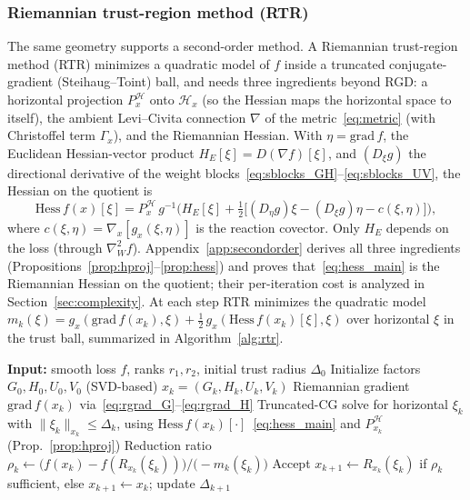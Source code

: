 \documentclass[letterpaper, 10 pt, conference]{ieeeconf}
\newcommand{\cH}{\mathcal{H}}
\theoremstyle{plain}
\theoremstyle{definition}
\theoremstyle{remark}
\begin{document}
\subsubsection{Riemannian trust-region method (RTR)}
\label{sec:rtr}
The same geometry supports a second-order method. A Riemannian trust-region method (RTR) minimizes a quadratic model of $f$ inside a truncated conjugate-gradient (Steihaug--Toint) ball, and needs three ingredients beyond RGD: a horizontal projection $P_x^{\cH}$ onto $\cH_x$ (so the Hessian maps the horizontal space to itself), the ambient Levi--Civita connection $\nabla$ of the metric~\eqref{eq:metric} (with Christoffel term $\Gamma_x$), and the Riemannian Hessian. With $\eta=\mathrm{grad}\,f$, the Euclidean Hessian-vector product $H_E[\xi]=D(\nabla f)[\xi]$, and $(D_\xi g)$ the directional derivative of the weight blocks~\eqref{eq:sblocks_GH}--\eqref{eq:sblocks_UV}, the Hessian on the quotient is
\begin{equation}
  \mathrm{Hess}\,f(x)[\xi] = P_x^{\cH}\,g^{-1}\!\Big(H_E[\xi] + \tfrac12\big[(D_\eta g)\xi - (D_\xi g)\eta - c(\xi,\eta)\big]\Big),
  \label{eq:hess_main}
\end{equation}
where $c(\xi,\eta)=\nabla_x[g_x(\xi,\eta)]$ is the reaction covector. Only $H_E$ depends on the loss (through $\nabla^2_W f$). Appendix~\ref{app:secondorder} derives all three ingredients (Propositions~\ref{prop:hproj}--\ref{prop:hess}) and proves that~\eqref{eq:hess_main} is the Riemannian Hessian on the quotient; their per-iteration cost is analyzed in Section~\ref{sec:complexity}. At each step RTR minimizes the quadratic model $m_k(\xi)=g_x(\mathrm{grad}\,f(x_k),\xi)+\tfrac12\,g_x(\mathrm{Hess}\,f(x_k)[\xi],\xi)$ over horizontal $\xi$ in the trust ball, summarized in Algorithm~\ref{alg:rtr}. 

\begin{algorithm}[t]
\caption{RTR on the Hadamard low-rank manifold}
\label{alg:rtr}
\begin{algorithmic}[1]
\STATE \textbf{Input:} smooth loss $f$, ranks $r_1,r_2$, initial trust radius $\Delta_0$
\STATE Initialize factors $G_0,H_0,U_0,V_0$ (SVD-based)
  \STATE $x_k=(G_k,H_k,U_k,V_k)$
  \STATE Riemannian gradient $\mathrm{grad}\,f(x_k)$ via~\eqref{eq:rgrad_G}--\eqref{eq:rgrad_H}
  \STATE Truncated-CG solve for horizontal $\xi_k$ with $\|\xi_k\|_{x_k}\le\Delta_k$, using $\mathrm{Hess}\,f(x_k)[\cdot]$~\eqref{eq:hess_main} and $P_{x_k}^{\cH}$ (Prop.~\ref{prop:hproj})
  \STATE Reduction ratio $\rho_k \leftarrow \big(f(x_k)-f(R_{x_k}(\xi_k))\big)/\big({-}m_k(\xi_k)\big)$
  \STATE Accept $x_{k+1}\leftarrow R_{x_k}(\xi_k)$ if $\rho_k$ sufficient, else $x_{k+1}\leftarrow x_k$; update $\Delta_{k+1}$
\ENDFOR
\end{algorithmic}
\end{algorithm}
\end{document}
